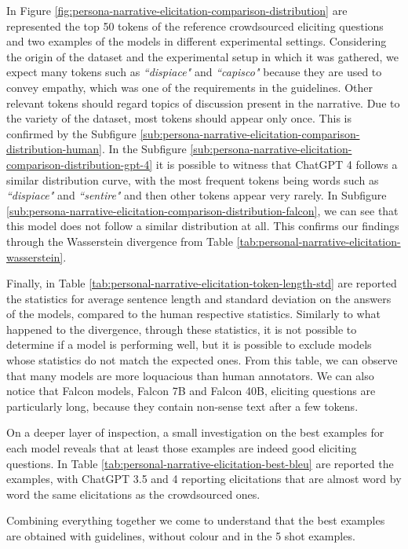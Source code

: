 In Figure \ref{fig:persona-narrative-elicitation-comparison-distribution} are represented the top 50 tokens of the reference crowdsourced eliciting questions and two examples of the models in different experimental settings. Considering the origin of the dataset and the experimental setup in which it was gathered, we expect many tokens such as \emph{``dispiace"} and \emph{``capisco"} because they are used to convey empathy, which was one of the requirements in the guidelines. Other relevant tokens should regard topics of discussion present in the narrative. Due to the variety of the dataset, most tokens should appear only once. This is confirmed by the Subfigure \ref{sub:persona-narrative-elicitation-comparison-distribution-human}. 
In the Subfigure \ref{sub:persona-narrative-elicitation-comparison-distribution-gpt-4} it is possible to witness that ChatGPT 4 follows a similar distribution curve, with the most frequent tokens being words such as \emph{``dispiace"} and \emph{``sentire"} and then other tokens appear very rarely. 
In Subfigure \ref{sub:persona-narrative-elicitation-comparison-distribution-falcon}, we can see that this model does not follow a similar distribution at all. This confirms our findings through the Wasserstein divergence from Table \ref{tab:personal-narrative-elicitation-wasserstein}.

% 
Finally, in Table \ref{tab:personal-narrative-elicitation-token-length-std} are reported the statistics for average sentence length and standard deviation on the answers of the models, compared to the human respective statistics. Similarly to what happened to the divergence, through these statistics, it is not possible to determine if a model is performing well, but it is possible to exclude models whose statistics do not match the expected ones.  From this table, we can observe that many models are more loquacious than human annotators. We can also notice that Falcon models, Falcon 7B and Falcon 40B, eliciting questions are particularly long, because they contain non-sense text after a few tokens.


On a deeper layer of inspection, a small investigation on the best examples for each model reveals that at least those examples are indeed good eliciting questions. In Table \ref{tab:personal-narrative-elicitation-best-bleu} are reported the examples, with ChatGPT 3.5 and 4 reporting elicitations that are almost word by word the same elicitations as the crowdsourced ones.

Combining everything together we come to understand that the best examples are obtained with guidelines, without colour and in the 5 shot examples. %